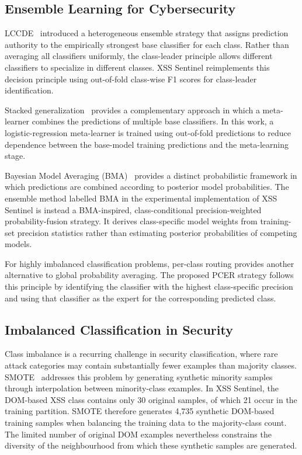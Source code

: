 \documentclass[11pt,a4paper]{article}
\begin{document}
\subsection{Ensemble Learning for Cybersecurity}

LCCDE~\cite{lccde2022} introduced a heterogeneous ensemble strategy that
assigns prediction authority to the empirically strongest base classifier for
each class. Rather than averaging all classifiers uniformly, the class-leader
principle allows different classifiers to specialize in different classes.
XSS Sentinel reimplements this decision principle using out-of-fold
class-wise F1 scores for class-leader identification.

Stacked generalization~\cite{wolpert1992} provides a complementary approach in
which a meta-learner combines the predictions of multiple base classifiers.
In this work, a logistic-regression meta-learner is trained using out-of-fold
predictions to reduce dependence between the base-model training predictions
and the meta-learning stage.

Bayesian Model Averaging (BMA)~\cite{hoeting1999} provides a distinct
probabilistic framework in which predictions are combined according to
posterior model probabilities. The ensemble method labelled BMA in the
experimental implementation of XSS Sentinel is instead a BMA-inspired,
class-conditional precision-weighted probability-fusion strategy. It derives
class-specific model weights from training-set precision statistics rather
than estimating posterior probabilities of competing models. 

For highly imbalanced classification problems, per-class routing provides
another alternative to global probability averaging. The proposed PCER
strategy follows this principle by identifying the classifier with the highest
class-specific precision and using that classifier as the expert for the
corresponding predicted class.

\subsection{Imbalanced Classification in Security}

Class imbalance is a recurring challenge in security classification, where
rare attack categories may contain substantially fewer examples than
majority classes. SMOTE~\cite{smote2002} addresses this problem by generating
synthetic minority samples through interpolation between minority-class
examples. In XSS Sentinel, the DOM-based XSS class contains only 30 original
samples, of which 21 occur in the training partition. SMOTE therefore
generates 4,735 synthetic DOM-based training samples when balancing the
training data to the majority-class count. The limited number of original DOM
examples nevertheless constrains the diversity of the neighbourhood from
which these synthetic samples are generated.
\end{document}
